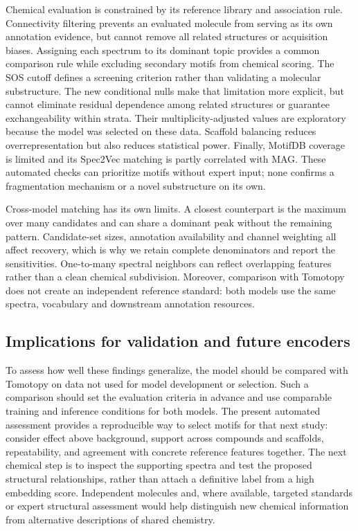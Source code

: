 \documentclass[10pt,a4paper]{article}
\begin{document}
Chemical evaluation is constrained by its reference library and association
rule. Connectivity filtering prevents an evaluated molecule from serving as
its own annotation evidence, but cannot remove all related structures or
acquisition biases. Assigning each spectrum to its dominant topic provides
a common comparison rule while excluding secondary motifs from chemical
scoring. The SOS cutoff defines a screening criterion rather than
validating a molecular substructure. The new conditional nulls make that
limitation more explicit, but cannot eliminate residual dependence among
related structures or guarantee exchangeability within strata. Their
multiplicity-adjusted values are exploratory because the model was selected
on these data. Scaffold balancing reduces overrepresentation but also
reduces statistical power. Finally, MotifDB coverage is limited and its
Spec2Vec matching is partly correlated with MAG. These automated checks
can prioritize motifs without expert input; none confirms a fragmentation
mechanism or a novel substructure on its own.

Cross-model matching has its own limits. A closest counterpart is the maximum
over many candidates and can share a dominant peak without the remaining
pattern. Candidate-set sizes, annotation availability and channel weighting
all affect recovery, which is why we retain complete denominators and report
the sensitivities. One-to-many spectral neighbors can reflect overlapping
features rather than a clean chemical subdivision. Moreover, comparison
with Tomotopy does not create an independent reference standard: both models
use the same spectra, vocabulary and downstream annotation resources.

\subsection{Implications for validation and future encoders}

To assess how well these findings generalize, the model should be compared
with Tomotopy on data not used for model development or selection. Such a
comparison should set the evaluation criteria in advance and use comparable
training and inference conditions for both models. The present automated
assessment provides a reproducible way to select motifs for that next study:
consider effect above background, support across compounds and scaffolds,
repeatability, and agreement with concrete reference features together.
The next chemical step is to inspect the supporting spectra and test the
proposed structural relationships, rather than attach a definitive label
from a high embedding score. Independent molecules and, where available,
targeted standards or expert structural assessment would help distinguish
new chemical information from alternative descriptions of shared chemistry.
\end{document}
